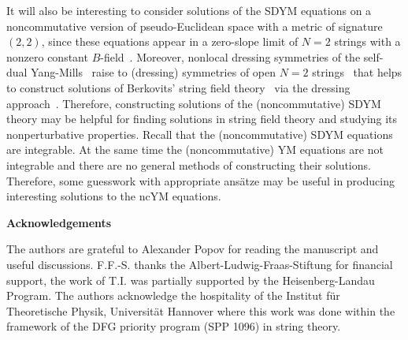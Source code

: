 \documentclass[a4paper,11pt]{article}
\numberwithin{equation}{section}
\begin{document}
It will also be interesting to consider solutions of the SDYM equations 
on a noncommutative version of pseudo-Euclidean space with a metric of signature
$(2,2)$, since these equations appear in a zero-slope limit of $N=2$ strings
 with a nonzero constant $B$-field~\cite{Le:2000nm}. Moreover,
nonlocal dressing symmetries of the self-dual Yang-Mills~\cite{6}
raise to (dressing) symmetries of open $N=2$ strings~\cite{5} 
that helps to construct solutions of Berkovits' string field theory~\cite{Berkovits:1995ab}
via the dressing approach~\cite{LPU}. Therefore,
constructing solutions of the (noncommutative) SDYM theory may be helpful for
finding solutions in string field theory and studying its nonperturbative properties. 
Recall that the (noncommutative) SDYM equations are integrable. At the same time
 the (noncommutative) YM equations are not integrable and  there are no general methods
of constructing their solutions. Therefore, some guesswork with  appropriate
ans\"atze may be useful in producing interesting solutions to the ncYM equations.

\bigskip

\noindent
{\large{\bf Acknowledgements}}

\smallskip
\noindent
The authors are grateful to Alexander Popov for reading  the manuscript 
and useful discussions. F.F.-S. thanks the Albert-Ludwig-Fraas-Stiftung for 
financial support, 
the work of T.I. was partially supported by the Heisenberg-Landau Program.
The authors acknowledge the hospitality of the Institut f\"ur Theoretische Physik, 
Universit\"at Hannover where this work was done within the framework 
of the DFG priority program (SPP 1096) in string theory.

\newpage
\end{document}
